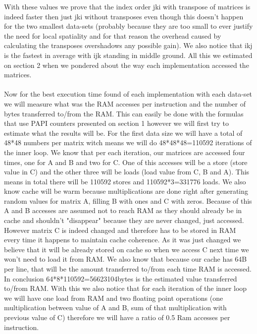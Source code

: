 \documentclass[journal]{IEEEtran}
\begin{document}
With these values we prove that the index order jki with transpose of matrices is indeed faster then just jki without transposes even though this doesn't happen for the two smallest data-sets (probably because they are too small to ever justify the need for local spatiality and for that reason the overhead caused by calculating the transposes overshadows any possible gain). We also notice that ikj is the fastest in average with ijk standing in middle ground. All this we estimated on section 2 when we pondered about the way each implementation accessed the matrices.\\ 
\\
Now for the best execution time found of each implementation with each data-set we will measure what was the RAM accesses per instruction and the number of bytes transferred to/from the RAM. This can easily be done with the formulas that use PAPI counters presented on section 1 however we will first try to estimate what the results will be. For the first data size we will have a total of 48*48 numbers per matrix witch means we will do 48*48*48=110592 iterations of the inner loop. We know that per each iteration, our matrices are accessed four times, one for A and B and two for C. One of this accesses will be a store (store value in C) and the other three will be loads (load value from C, B and A). This means in total there will be 110592 stores and 110592*3=331776 loads. We also know cache will be warm because multiplications are done right after generating random values for matrix A, filling B with ones and C with zeros. Because of this A and B accesses are assumed not to reach RAM as they should already be in cache and shouldn't "disappear" because they are never changed, just accessed. However matrix C is indeed changed and therefore has to be stored in RAM every time it happens to maintain cache coherence. As it was just changed we believe that it will be already stored on cache so when we access C next time we won't need to load it from RAM. We also know that because our cache has 64B per line, that will be the amount transferred to/from each time RAM is accessed. In conclusion 64*8*110592=56623104bytes is the estimated value transferred to/from RAM. With this we also notice that for each iteration of the inner loop we will have one load from RAM and two floating point operations (one multiplication between value of A and B, sum of that multiplication with previous value of C) therefore we will have a ratio of 0.5 Ram accesses per instruction.\\
\end{document}
